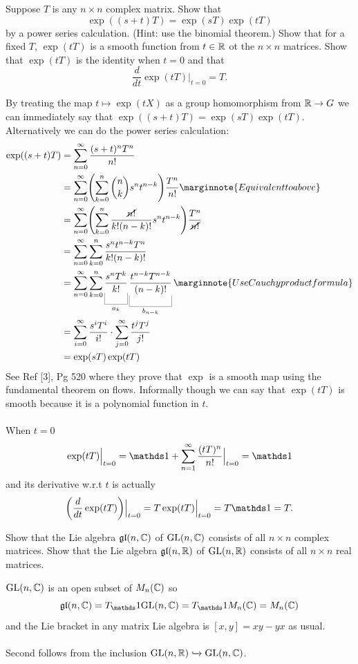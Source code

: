 \documentclass[10pt]{article}
\begin{document}
\begin{example}
	Suppose $T$ is any $n \times n$ complex matrix. Show that
	$$
	\exp((s+t)T)=\exp(sT)\exp(tT)
	$$
	by a power series calculation. (Hint: use the binomial theorem.) Show that for a fixed $T$, $\exp(tT)$ is a smooth function from $t\in\mathbb{R}$ ot the $n \times n$ matrices. Show that $\exp(tT)$ is the identity when $t=0$ and that
	$$
	\frac{d}{dt}\exp(tT)\Big|_{t=0} = T.
	$$
\end{example}
\sol By treating the map $t \mapsto \exp(tX)$ as a group homomorphism from $\mathbb{R} \to G$ we can immediately say that $\exp((s+t)T)=\exp(sT)\exp(tT)$. Alternatively we can do the power series calculation:
$$
\begin{aligned}
	\exp((s+t)T) &= \sum_{n=0}^{\infty}\frac{(s+t)^nT^n}{n!}\\
	&= \sum_{n=0}^{\infty}\p*{\sum_{k=0}^{n}{n\choose k}s^nt^{n-k}}\frac{T^n}{n!}\marginnote{Equivalent to above}\\
	&= \sum_{n=0}^{\infty}\p*{\sum_{k=0}^{n}\frac{\cancel{n!}}{k!(n-k)!}s^nt^{n-k}}\frac{T^n}{\cancel{n!}}\\
	&= \sum_{n=0}^{\infty}\sum_{k=0}^{n}\frac{s^nt^{n-k}T^n}{k!(n-k)!}\\
	&= \sum_{n=0}^{\infty}\sum_{k=0}^{n}\ub{\frac{s^nT^k}{k!}}{a_k}\ub{\frac{t^{n-k}T^{n-k}}{(n-k)!}}{b_{n-k}}\marginnote{Use Cauchy product formula}\\
	&= \sum_{i=0}^{\infty}\frac{s^iT^i}{i!} \cdot \sum_{j=0}^{\infty}\frac{t^jT^j}{j!}\\
	&=\exp(sT)\exp(tT)
\end{aligned}
$$
See Ref [3], Pg 520 where they prove that $\exp$ is a smooth map using the fundamental theorem on flows. Informally though we can say that $\exp(tT)$ is smooth because it is a polynomial function in $t$.\\\\
When $t=0$
$$
\exp(tT)\Big|_{t=0} = \id + \sum_{n=1}^{\infty} \frac{(tT)^n}{n!}\Big|_{t=0} = \id
$$
and  its derivative w.r.t $t$ is actually
$$
\p*{\frac{d}{dt}\exp(tT)}\Big|_{t=0} = T\exp(tT)\Big|_{t=0} = T\id = T.
$$


\begin{example}
	Show that the Lie algebra $\mathfrak{gl}(n,\mathbb{C})$ of $\text{GL}(n,\mathbb{C})$ consists of all $n \times n$ complex matrices. Show that the Lie algebra $\mathfrak{gl}(n,\mathbb{R})$ of $\text{GL}(n,\mathbb{R})$ consists of all $n \times n$ real matrices.
\end{example}
\sol $\text{GL}(n,\mathbb{C})$  is an open subset of $M_n(\mathbb{C})$ so
$$
\mf{gl}(n,\C) = T_\id\GL(n,\C) = T_\id M_n(\C) = M_n(\C)
$$
and the Lie bracket in any matrix Lie algebra is $[x,y]=xy-yx$ as usual.\\\\
Second follows from the inclusion $\text{GL}(n,\mathbb{R}) \xhookrightarrow{} \text{GL}(n,\mathbb{C})$.
\end{document}
